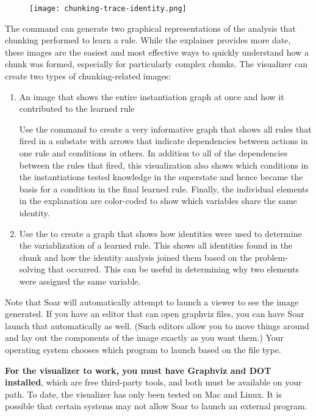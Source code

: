 \begin{figure}[!h]
	\centering
	\texttt{[image: chunking-trace-identity.png]}
	\label{fig:chunking-viz-identity}
\end{figure}

The  command can generate two graphical representations of the analysis that chunking performed to learn a rule. While the explainer provides more date, these images are the easiest and most effective ways to quickly understand how a chunk was formed, especially for particularly complex chunks.  The visualizer can create two types of chunking-related images:

\begin{enumerate}
	\item An image that shows the entire instantiation graph at once and how it contributed to the learned rule
	
	Use the command  to create a very informative graph that shows all rules that fired in a substate with arrows that indicate dependencies between actions in one rule and conditions in others. In addition to all of the dependencies between the rules that fired, this visualization also shows which conditions in the instantiations tested knowledge in the superstate and hence became the basis for a condition in the final learned rule.  Finally, the individual elements in the explanation are color-coded to show which variables share the same identity.


	\item Use the  to create a graph that shows how identities were used to determine the variablization of a learned rule. This shows all identities found in the chunk and how the identity analysis joined them based on the problem-solving that occurred. This can be useful in determining why two elements were assigned the same variable.
\end{enumerate}

Note that Soar will automatically attempt to launch a viewer to see the image generated. If you have an editor that can open graphviz files, you can have Soar launch that automatically as well. (Such editors allow you to move things around and lay out the components of the image exactly as you want them.) Your operating system chooses which program to launch based on the file type. 

\textbf{For the visualizer to work, you must have Graphviz and DOT installed}, which are free third-party tools, and both must be available on your path.  To date, the visualizer has only been tested on Mac and Linux.  It is possible that certain systems may not allow Soar to launch an external program.